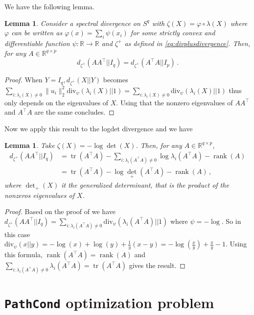 \documentclass{article}
\theoremstyle{plain}
\newtheorem{lemma}[theorem]{Lemma}
\theoremstyle{definition}
\theoremstyle{remark}
\def\tr{{\operatorname{tr}}}
\def\rank{\operatorname{rank}}
\def\R{{\mathbb{R}}}
\def\pathcond{{\texttt{PathCond} }}
\begin{document}
{We have the following lemma.
\begin{lemma}
\label{lemma:reverse_transpose}
Consider a spectral divergence on $S^q$ with $\zeta(X) = \varphi \circ \lambda(X)$ 
where $\varphi$ can be written as $\varphi(x) = \sum_i \psi(x_i)$ for some strictly convex and differentiable function $\psi: \R \to \R$ 
and $\zeta^+$ as defined in \eqref{eq:divplusdivergence}.
Then, for any $A \in \R^{q \times p}$
\begin{equation}
d_{\zeta^+}(AA^\top || I_q) = d_{\zeta^+}(A^\top A|| I_p)\,.
\end{equation}
\end{lemma}
\begin{proof}
When $Y = I_q, d_{\zeta^+}(X|| Y)$ becomes $\sum_{i: \lambda_i(X)\neq 0} \|u_i\|_2^2 \text{div}_\psi(\lambda_i(X)|| 1) 
= \sum_{i: \lambda_i(X)\neq 0} \text{div}_\psi(\lambda_i(X)|| 1)$ thus only depends on the eigenvalues of $X$.
Using that the nonzero eigenvalues of $AA^\top$ and $A^\top A$ are the same concludes.
\end{proof}
Now we apply this result to the logdet divergence and we have
\begin{lemma}
    \label{lemma:totheloss}
    Take $\zeta(X) = -\log \det(X)$. Then, for any $A \in \R^{q \times p}$, 
    \begin{equation}
        \begin{split}
            d_{\zeta^+}(AA^\top || I_q) &= \tr(A^\top A) - \sum_{i: \lambda_i(A^\top A) \neq 0} \log \lambda_i(A^\top A) - \rank(A)\\
            &=\tr(A^\top A) - \log {\det}_+(A^\top A) - \rank(A) \,,
        \end{split}
    \end{equation}
    where $\det_+(X)$ it the generalized determinant, that is the product of the nonzeros eigenvalues of $X$.
\end{lemma}
\begin{proof}
    Based on the proof of  we have $d_{\zeta^+}(AA^\top || I_q)= \sum_{i: \lambda_i(A^\top A)\neq 0} \text{div}_\psi(\lambda_i(A^\top A)|| 1)$ 
    where $\psi = - \log$. So in this case $\text{div}_\psi(x||y) = -\log(x)+\log(y)+\frac{1}{y}(x-y) = -\log(\frac{x}{y})+\frac{x}{y} - 1$. 
    Using this formula, $\rank(A^\top A)= \rank(A)$ and $\sum_{i:\lambda_i(A^\top A) \neq 0} \lambda_i(A^\top A) = \tr(A^\top A)$ gives the result.
\end{proof}
\section{\pathcond optimization problem \label{sec:pathcondopt}}

}
\end{document}
